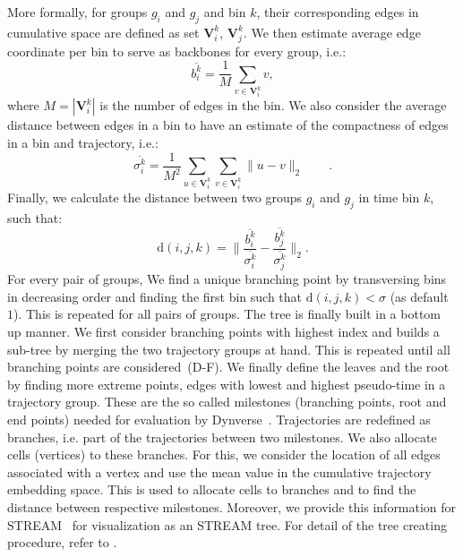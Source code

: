 More formally, for groups $g_i$ and $g_j$ and bin $k$, their corresponding edges in cumulative space are defined as set $\mathbf{V}^k_i$, $\mathbf{V}^k_j$. We then estimate average edge coordinate per bin to serve as backbones for every group, i.e.:
\begin{equation}
    \overline{b^k_i} = \frac{1}{M}\sum_{v \in \mathbf{V}^k_i } v,
\end{equation}
where $M=|\mathbf{V}^k_i|$ is the number of edges in the bin. We also consider the average distance between edges in a bin to have an estimate of the compactness of edges in a bin and trajectory, i.e.:
\begin{equation}
    \overline{\sigma^k_i} = \frac{1}{M^2} \sum_{u \in \mathbf{V}^k_i}  \sum_{v \in \mathbf{V}^k_i} \Big\|u-v\Big\|_2 \qquad.
\end{equation}
Finally, we calculate the distance between two groups $g_i$ and $g_j$ in time bin $k$, such that:
\begin{equation}
    \mathrm{d}(i,j,k) = \Bigg\| \frac{ \overline{b^k_i} }{ \overline{\sigma^k_i}} - \frac{ \overline{b^k_j} }{ \overline{\sigma^k_j}} \Bigg\|_2.
    \label{eqn:dijk}
\end{equation}
For every pair of groups, We find a unique branching point by transversing bins in decreasing order and finding the first bin such that $\mathrm{d}(i,j,k) < \sigma$ (as default $1$).
This is repeated for all pairs of groups. The tree is finally built in a bottom up manner. We first consider branching points with highest index and builds a sub-tree by merging the two trajectory groups at hand. This is repeated until all branching points are considered~(D-F). We finally define the leaves and the root by finding more extreme points, edges with lowest and highest pseudo-time in a trajectory group. These are the so called milestones (branching points, root and end points) needed for evaluation by Dynverse~\citep{saelens2019comparison}. Trajectories are redefined as branches, i.e. part of the trajectories between two milestones. We also allocate cells (vertices) to these branches. For this, we consider the location of all edges associated with a vertex and use the mean value in the cumulative trajectory embedding space. This is used to allocate cells to branches and to find the distance between respective milestones. Moreover, we provide this information for STREAM~\citep{chen2019stream} for visualization as an STREAM tree. For detail of the tree creating procedure, refer to .


